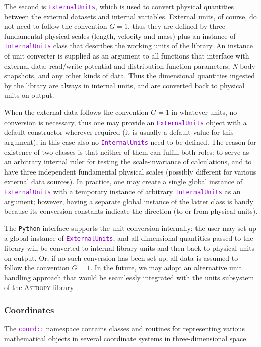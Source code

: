 \documentclass[12pt]{article}
\newcommand{\Nbody}{\textsl{N}-body\xspace}
\newcommand{\Python}{\texttt{Python}\xspace}
\newcommand{\ttt}[1]{\textcolor{darkviolet}{\texttt{#1}}}
\begin{document}
The second is \ttt{ExternalUnits}, which is used to convert physical quantities between the external datasets and internal variables. External units, of course, do not need to follow the convention $G=1$, thus they are defined by three fundamental physical scales (length, velocity and mass) plus an instance of \ttt{InternalUnits} class that describes the working units of the library. An instance of unit converter is supplied as an argument to all functions that interface with external data: read/write potential and distribution function parameters, \Nbody snapshots, and any other kinds of data. Thus the dimensional quantities ingested by the library are always in internal units, and are converted back to physical units on output.

When the external data follows the convention $G=1$ in whatever units, no conversion is necessary, thus one may provide an \ttt{ExternalUnits} object with a default constructor wherever required (it is usually a default value for this argument); in this case also no \ttt{InternalUnits} need to be defined. The reason for existence of two classes is that neither of them can fulfill both roles: to serve as an arbitrary internal ruler for testing the scale-invariance of calculations, and to have three independent fundamental physical scales (possibly different for various external data sources). In practice, one may create a single global instance of \ttt{ExternalUnits} with a temporary instance of arbitrary \ttt{InternalUnits} as an argument; however, having a separate global instance of the latter class is handy because its conversion constants indicate the direction (to or from physical units).

The \Python interface supports the unit conversion internally: the user may set up a global instance of \ttt{ExternalUnits}, and all dimensional quantities passed to the library will be converted to internal library units and then back to physical units on output. Or, if no such conversion has been set up, all data is assumed to follow the convention $G=1$. In the future, we may adopt an alternative unit handling approach that would be seamlessly integrated with the units subsystem of the \textsc{Astropy} library \cite{Astropy}.


\subsubsection{Coordinates}  \label{sec:Coords}
The \ttt{coord::} namespace contains classes and routines for representing various mathematical objects in several coordinate systems in three-dimensional space.
\end{document}
